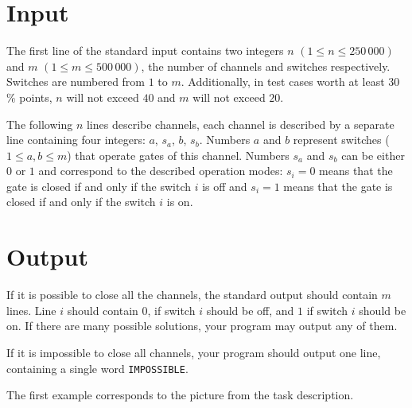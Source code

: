 \documentclass[zad,zawodnik,en]{sinol}
\begin{document}
\begin{text}
    \section{Input}
      The first line of the standard input contains two integers $n$ $(1 \le n \le 250\,000)$ 
		and $m$ $(1 \le m \le 500\,000)$, the number of channels and switches respectively.
      Switches are numbered from $1$ to $m$. Additionally, in test cases worth at least $30$\% points,
		$n$ will not exceed $40$ and $m$ will not exceed $20$.
		

      The following $n$ lines describe channels, each channel is described by 
      a separate line containing four integers:
      $a$, $s_a$, $b$, $s_b$.
      Numbers $a$ and $b$ represent switches ($1\le a,b\le m$) that operate gates
      of this channel.
      Numbers $s_a$ and $s_b$ can be either $0$ or $1$ and correspond to the described
      operation modes: $s_i=0$ means that the gate is closed if and only if the
      switch $i$ is off and $s_i=1$ means that the gate is closed if and only
      if the switch $i$ is on.

    \section{Output}
      If it is possible to close all the channels, the standard output should contain
      $m$ lines.
      Line $i$ should contain $0$, if switch $i$ should be off, and $1$ if
      switch $i$ should be on.
      If there are many possible solutions, your program may output any of them.

      If it is impossible to close all channels, your program should output one
      line, containing a single word \texttt{IMPOSSIBLE}.

  \makecompactexample

  \noindent
  The first example corresponds to the picture from the task description.
  \end{text}
\end{document}
